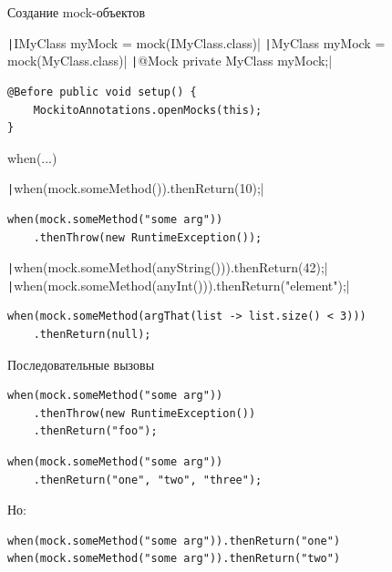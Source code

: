 \documentclass{../../slides-style}
\begin{document}
    \begin{frame}[fragile]{Создание mock-объектов}
        \begin{outline}
            \1 \texttt|IMyClass myMock = mock(IMyClass.class)|
            \1 \texttt|MyClass myMock = mock(MyClass.class)|
            \1 \texttt|@Mock private MyClass myMock;|
                \2 
                    \begin{verbatim}
@Before public void setup() { 
    MockitoAnnotations.openMocks(this); 
}
                    \end{verbatim}
        \end{outline}
    \end{frame}

    \begin{frame}[fragile]{when(...)}
        \begin{outline}
            \1 \texttt|when(mock.someMethod()).thenReturn(10);|
            \1 
                \begin{verbatim}
when(mock.someMethod("some arg"))
    .thenThrow(new RuntimeException());
                \end{verbatim}
            \1 \texttt|when(mock.someMethod(anyString())).thenReturn(42);|
            \1 \texttt|when(mock.someMethod(anyInt())).thenReturn("element");|
            \1 
                \begin{verbatim}
when(mock.someMethod(argThat(list -> list.size() < 3)))
    .thenReturn(null);
                \end{verbatim}
        \end{outline}
    \end{frame}

    \begin{frame}[fragile]{Последовательные вызовы}
        \begin{outline}
            \1 
                \begin{verbatim}
when(mock.someMethod("some arg"))
    .thenThrow(new RuntimeException())
    .thenReturn("foo");
                \end{verbatim}
            \1 
                \begin{verbatim}
when(mock.someMethod("some arg"))
    .thenReturn("one", "two", "three");
                \end{verbatim}
            \1 Но:
                \begin{verbatim}
when(mock.someMethod("some arg")).thenReturn("one")
when(mock.someMethod("some arg")).thenReturn("two")
                \end{verbatim}
        \end{outline}
    \end{frame}
\end{document}
